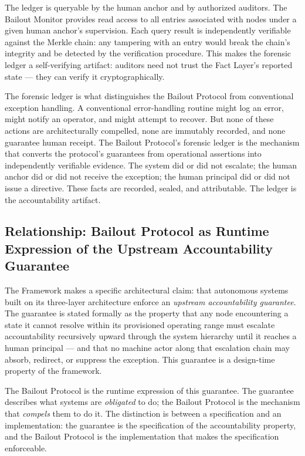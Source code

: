 The ledger is queryable by the human anchor and by authorized auditors. The Bailout Monitor provides read access to all entries associated with nodes under a given human anchor's supervision. Each query result is independently verifiable against the Merkle chain: any tampering with an entry would break the chain's integrity and be detected by the verification procedure. This makes the forensic ledger a self-verifying artifact: auditors need not trust the Fact Layer's reported state --- they can verify it cryptographically.

The forensic ledger is what distinguishes the Bailout Protocol from conventional exception handling. A conventional error-handling routine might log an error, might notify an operator, and might attempt to recover. But none of these actions are architecturally compelled, none are immutably recorded, and none guarantee human receipt. The Bailout Protocol's forensic ledger is the mechanism that converts the protocol's guarantees from operational assertions into independently verifiable evidence. The system did or did not escalate; the human anchor did or did not receive the exception; the human principal did or did not issue a directive. These facts are recorded, sealed, and attributable. The ledger is the accountability artifact.

\subsection{Relationship: Bailout Protocol as Runtime Expression of the Upstream Accountability Guarantee}
\label{sec:bailout-as-runtime-expression}

The \bxthree{} Framework makes a specific architectural claim: that autonomous systems built on its three-layer architecture enforce an \emph{upstream accountability guarantee}. The guarantee is stated formally as the property that any \bxthree{} node encountering a state it cannot resolve within its provisioned operating range must escalate accountability recursively upward through the system hierarchy until it reaches a human principal --- and that no machine actor along that escalation chain may absorb, redirect, or suppress the exception. This guarantee is a design-time property of the framework.

The Bailout Protocol is the runtime expression of this guarantee. The guarantee describes what \bxthree{} systems are \emph{obligated} to do; the Bailout Protocol is the mechanism that \emph{compels} them to do it. The distinction is between a specification and an implementation: the guarantee is the specification of the accountability property, and the Bailout Protocol is the implementation that makes the specification enforceable.

